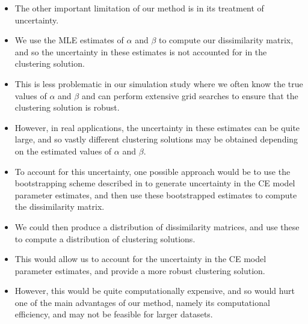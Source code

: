 \documentclass{article}
\numberwithin{equation}{section}
\begin{document}
\begin{itemize}
  \item The other important limitation of our method is in its treatment of uncertainty. 
  \item We use the MLE estimates of $\alpha$ and $\beta$ to compute our dissimilarity matrix, and so the uncertainty in these estimates is not accounted for in the clustering solution.
  \item This is less problematic in our simulation study where we often know the true values of $\alpha$ and $\beta$ and can perform extensive grid searches to ensure that the clustering solution is robust.
  \item However, in real applications, the uncertainty in these estimates can be quite large, and so vastly different clustering solutions may be obtained depending on the estimated values of $\alpha$ and $\beta$.
  \item To account for this uncertainty, one possible approach would be to use the bootstrapping scheme described in \citet{Heffernan2004} to generate uncertainty in the CE model parameter estimates, and then use these bootstrapped estimates to compute the dissimilarity matrix.
  \item We could then produce a distribution of dissimilarity matrices, and use these to compute a distribution of clustering solutions.
  \item This would allow us to account for the uncertainty in the CE model parameter estimates, and provide a more robust clustering solution.
  \item However, this would be quite computationally expensive, and so would hurt one of the main advantages of our method, namely its computational efficiency, and may not be feasible for larger datasets.
\end{itemize}

\vspace{1cm}

\end{document}
